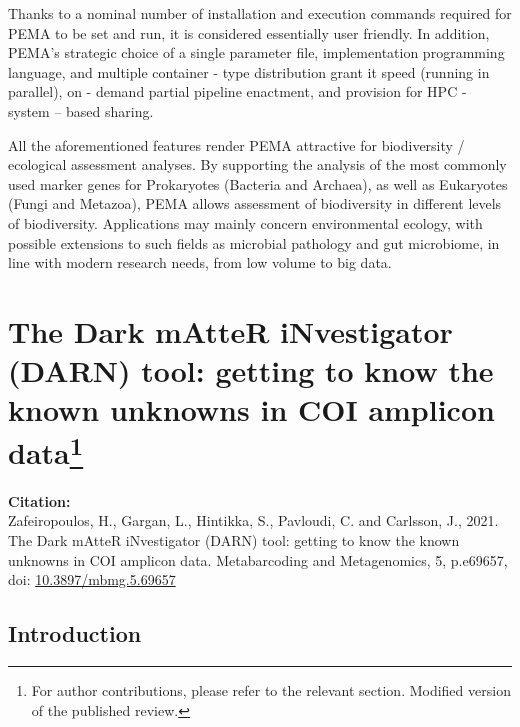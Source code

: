    Thanks to a nominal number of installation and execution commands required for PEMA to be set and run, it is considered essentially user friendly. 
   In addition, PEMA's strategic choice of a single parameter file, implementation programming language, and multiple container - type distribution grant it speed (running in parallel), on - demand partial pipeline enactment, and provision for HPC - system – based sharing.

   All the aforementioned features render PEMA attractive for biodiversity / ecological assessment analyses. 
   By supporting the analysis of the most commonly used marker genes for Prokaryotes (Bacteria and Archaea), as well as Eukaryotes (Fungi and Metazoa), PEMA allows assessment of biodiversity in different levels of biodiversity. 
   Applications may mainly concern environmental ecology, with possible extensions to such fields as microbial pathology and gut microbiome, in line with modern research needs, from low volume to big data.



\newpage












% 
% 

\newpage

\section[The Dark mAtteR iNvestigator (DARN) tool: getting to know the known unknowns in COI amplicon data]{The Dark mAtteR iNvestigator (DARN) tool: getting to know the known unknowns in COI amplicon data\footnote{For author contributions, please refer to the relevant section. Modified version of the published review.}}

\textbf{Citation:} \\
Zafeiropoulos, H., Gargan, L., Hintikka, S., Pavloudi, C. and Carlsson, J., 2021. The Dark mAtteR iNvestigator (DARN) tool: getting to know the known unknowns in COI amplicon data. Metabarcoding and Metagenomics, 5, p.e69657, \\
doi: \href{https://doi.org/10.3897/mbmg.5.69657}{10.3897/mbmg.5.69657}

\subsection{Introduction}

